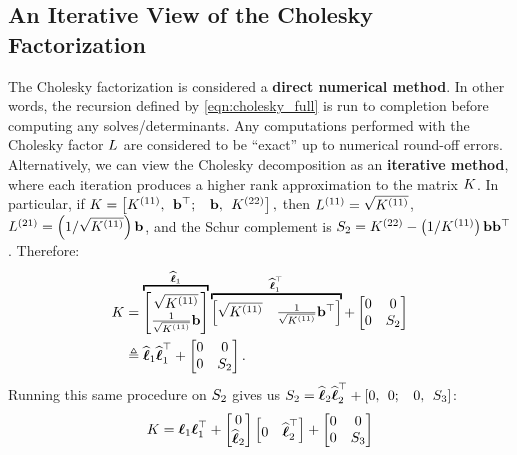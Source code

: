 \subsection{An Iterative View of the Cholesky Factorization}
The Cholesky factorization is considered a {\bf direct numerical method}.
In other words, the recursion defined by \cref{eqn:cholesky_full} is run to completion before computing any solves/determinants.
Any computations performed with the Cholesky factor $L$ are considered to be ``exact'' up to numerical round-off errors.
Alternatively, we can view the Cholesky decomposition as an {\bf iterative method}, where each iteration produces a higher rank approximation to the matrix $K$.
In particular, if  $ K = \left[ K^{(11)}, \:\: \mathbf{b}^{\top}; \:\:\:\: \mathbf{b}, \:\: K^{(22)} \right], $
then $L^{(11)} = \sqrt{K^{(11)}}$, $L^{(21)} = \left( 1 / \sqrt{K^{(11)}} \right) \mathbf{b}$, and the Schur complement is $S_2 = K^{(22)} - \left(1/ K^{(11)} \right) \mathbf{b} \mathbf{b}^{\top}$.
Therefore:
%
\begin{align}
  \bK &=
    \overbracket{\begin{bmatrix} \sqrt{ K^{(11)} } \\ \frac{1}{\sqrt{K^{(11)}}} \bb \end{bmatrix}}^{\widehat \bl_1}
    \overbracket{\begin{bmatrix} \sqrt{ K^{(11)} } & \frac{1}{\sqrt{K^{(11)}}} \bb^\top \end{bmatrix}}^{\widehat \bl_1^\top}
    +
    \begin{bmatrix} 0 & 0 \\ 0 & \bS_2 \end{bmatrix}
  \nonumber \\
  &\triangleq \widehat \bl_{1} \widehat \bl_{1}^{\top} + \begin{bmatrix} 0 & 0 \\ 0 & \bS_2 \end{bmatrix}
  \label{eqn:chol_incomplete}.
\end{align}
%
Running this same procedure on $S_2$ gives us $S_2 = \widehat {\boldsymbol{\ell}}_{2} \widehat {\boldsymbol{\ell}}_{2}^{\top} + \left[0, \:\: 0; \:\:\:\: 0, \:\: S_3 \right]$:
%
\begin{align*}
  K  = \boldsymbol{\ell}_{1}\boldsymbol{\ell}_{1}^{\top} + \begin{bmatrix} 0 \\ \widehat {\boldsymbol{\ell}}_{2} \end{bmatrix} \begin{bmatrix} 0 & \widehat {\boldsymbol{\ell}}_2^\top \end{bmatrix} +
  \begin{bmatrix} 0 & 0 \\ 0 & S_3 \end{bmatrix}
\end{align*}
